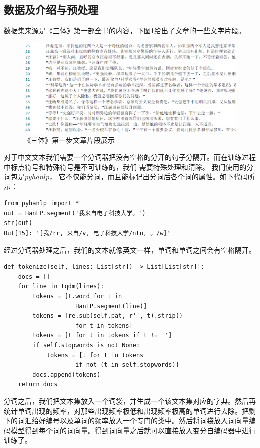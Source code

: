 \documentclass[twocolumn]{article}
\begin{document}
\subsection{数据及介绍与预处理}
    数据集来源是《三体》第一部全书的内容，下图\ref{fig:003}给出了文章的一些文字片段。
\begin{figure}
    \centering
    \includegraphics[width=0.9\linewidth]{figures/003}
    \caption{{\small《三体》第一步文章片段展示}}
    \label{fig:003}
\end{figure}
    对于中文文本我们需要一个分词器把没有空格的分开的句子分隔开。而在训练过程中标点符号和特殊符号是不可训练的，我们
    需要特殊处理和清除。
    我们使用的分词包是$ pyhanlp $， 它不仅能分词，而且能标记出分词后各个词的属性。如下代码所示：
\begin{verbatim}
from pyhanlp import *
out = HanLP.segment('我来自电子科技大学。')
str(out)
Out[15]: '[我/rr, 来自/v, 电子科技大学/ntu, 。/w]'
\end{verbatim}
    经过分词器处理之后，我们的文本就像英文一样，单词和单词之间会有空格隔开。
\begin{verbatim}
def tokenize(self, lines: List[str]) -> List[List[str]]:
    docs = []
    for line in tqdm(lines):
        tokens = [t.word for t in 
                    HanLP.segment(line)]
        tokens = [re.sub(self.pat, r'', t).strip() 
                    for t in tokens]
        tokens = [t for t in tokens if t != '']
        if self.stopwords is not None:
            tokens = [t for t in tokens 
                    if not (t in self.stopwords)]
        docs.append(tokens)
    return docs
\end{verbatim}

    分词之后，我们把文本集放入一个词袋，并生成一个该文本集对应的字典。然后再统计单词出现的频率，对那些出现频率极低和出现频率极高的单词进行去除。把剩下的词汇给好编号以及单词的频率放入一个专门的类中。然后将词袋放入词向量编码模型得到每个词的词向量。得到词向量之后就可以直接放入变分自编码器中进行训练了。
    
\end{document}
